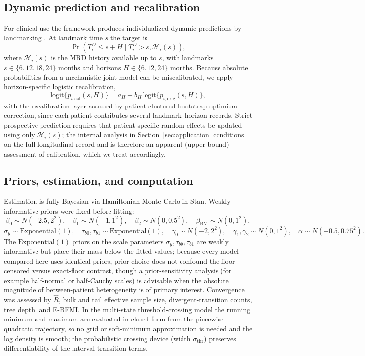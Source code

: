 \documentclass[11pt]{article}
\begin{document}
\subsection{Dynamic prediction and recalibration}
\label{sec:dynamic}

For clinical use the framework produces individualized dynamic predictions by
landmarking \cite{vanHouwelingen2007Landmarking,Rizopoulos2011DynamicPredictions}.
At landmark time $s$ the target is
\[
\Pr(T_i^D\le s+H\mid T_i^D>s,\mathcal H_i(s)),
\]
where $\mathcal H_i(s)$ is the MRD history available up to $s$, with
landmarks $s\in\{6,12,18,24\}$ months and horizons $H\in\{6,12,24\}$
months. Because absolute probabilities from a mechanistic joint model can
be miscalibrated, we apply horizon-specific logistic recalibration,
\[
\mathrm{logit}\{p_{i,\mathrm{cal}}(s,H)\}
=a_H+b_H\,\mathrm{logit}\{p_{i,\mathrm{orig}}(s,H)\},
\]
with the recalibration layer assessed by patient-clustered bootstrap optimism
correction, since each patient contributes several landmark--horizon records.
Strict prospective prediction requires that patient-specific random
effects be updated using only $\mathcal H_i(s)$; the internal analysis in
Section~\ref{sec:application} conditions on the full longitudinal record
and is therefore an apparent (upper-bound) assessment of calibration,
which we treat accordingly.

\subsection{Priors, estimation, and computation}
\label{sec:computation}

Estimation is fully Bayesian via Hamiltonian Monte Carlo in Stan.
Weakly informative priors were fixed before fitting:
\[
\beta_0\sim N(-2.5,2^2),\quad
\beta_1\sim N(-1,1^2),\quad
\beta_2\sim N(0,0.5^2),\quad
\beta_{\mathrm{BM}}\sim N(0,1^2),
\]
\[
\sigma_y\sim \mathrm{Exponential}(1),\quad
\tau_{b0},\tau_{b1}\sim \mathrm{Exponential}(1),\quad
\gamma_0\sim N(-2,2^2),\quad
\gamma_1,\gamma_2\sim N(0,1^2),\quad
\alpha\sim N(-0.5,0.75^2).
\]
The $\mathrm{Exponential}(1)$ priors on the scale parameters
$\sigma_y,\tau_{b0},\tau_{b1}$ are weakly informative but place their mass
below the fitted values; because every model compared here uses identical
priors, prior choice does not confound the floor-censored versus exact-floor
contrast, though a prior-sensitivity analysis (for example half-normal or
half-Cauchy scales) is advisable when the absolute magnitude of
between-patient heterogeneity is of primary interest.
Convergence was assessed by $\widehat{R}$, bulk and tail effective sample
size, divergent-transition counts, tree depth, and E-BFMI. In the multi-state threshold-crossing model the running minimum and maximum
are evaluated in closed form from the piecewise-quadratic trajectory, so no
grid or soft-minimum approximation is needed and the log density is smooth;
the probabilistic crossing device (width $\sigma_{\mathrm{thr}}$) preserves
differentiability of the interval-transition terms.
\end{document}
